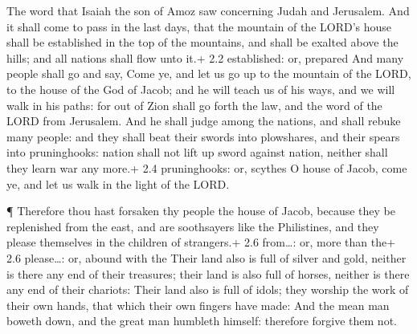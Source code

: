  The word that Isaiah the son of Amoz saw concerning Judah
and Jerusalem.  And it shall come to pass in the last days,
that the mountain of the LORD's house shall be established in the top of
the mountains, and shall be exalted above the hills; and all nations
shall flow unto it.+ 2.2 established: or, prepared  And many
people shall go and say, Come ye, and let us go up to the mountain of
the LORD, to the house of the God of Jacob; and he will teach us of his
ways, and we will walk in his paths: for out of Zion shall go forth the
law, and the word of the LORD from Jerusalem.  And he shall
judge among the nations, and shall rebuke many people: and they shall
beat their swords into plowshares, and their spears into pruninghooks:
nation shall not lift up sword against nation, neither shall they learn
war any more.+ 2.4 pruninghooks: or, scythes  O house of
Jacob, come ye, and let us walk in the light of the LORD.

 ¶ Therefore thou hast forsaken thy people the house of
Jacob, because they be replenished from the east, and are soothsayers
like the Philistines, and they please themselves in the children of
strangers.+ 2.6 from\ldots: or, more than the+ 2.6 please\ldots: or,
abound with the  Their land also is full of silver and gold,
neither is there any end of their treasures; their land is also full of
horses, neither is there any end of their chariots:  Their
land also is full of idols; they worship the work of their own hands,
that which their own fingers have made:  And the mean man
boweth down, and the great man humbleth himself: therefore forgive them
not.


